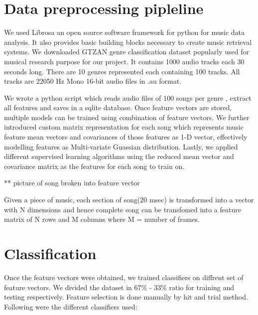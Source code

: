 \documentclass[conference]{IEEEtran}
\begin{document}


\section{Data preprocessing pipleline}
\label{sec:Data preprocessing}
We used Librosa an open source software framework for python for music data analysis. It also provides basic building blocks necessary to create music retrieval systems. We downloaded GTZAN genre classification dataset popularly used for musical research purpose for our project. It contains 1000 audio tracks each 30 seconds long. There are 10 genres represented each containing 100 tracks. All tracks are 22050 Hz Mono 16-bit audio files in .au format.

We wrote a python script which reads audio files of 100 songs per genre , extract all features and saves in a sqlite database. Once feature vectors are stored, multiple models
can be trained using combination of feature vectors. We further introduced custom matrix representation for each song which represents music feature mean vectors and covariances
of those features as 1-D vector, effectively modelling features as Multi-variate Guassian distribution. Lastly, we applied different supervised learning algorithms
using the reduced mean vector and covariance matrix as the features for each song to train on.

** picture of song broken into feature vector


Given a piece of music, each section of song(20 msec) is transformed into a vector with N dimensions and hence complete song can be transfomed into a feature matrix of N rows
and M columns where M = number of frames.

\section{Classification}
Once the feature vectors were obtained, we trained classifiers on diffrent set of feature vectors. We divided the dataset in 67\% - 33\% ratio for training and testing respectively. Feature selection is done manually by hit and trial method. Following were the different classifiers used:
\end{document}
